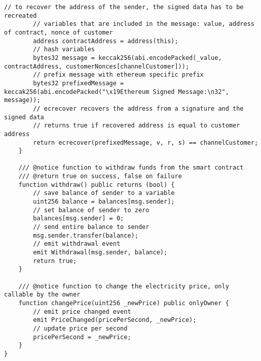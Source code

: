 \begin{lstlisting}[language=Solidity, caption={Payment Channel Smart Contract}, label={lis:pc_sc}]
        // to recover the address of the sender, the signed data has to be recreated
        // variables that are included in the message: value, address of contract, nonce of customer
        address contractAddress = address(this);
        // hash variables
        bytes32 message = keccak256(abi.encodePacked(_value, contractAddress, customerNonces[channelCustomer]));
        // prefix message with ethereum specific prefix
        bytes32 prefixedMessage = keccak256(abi.encodePacked("\x19Ethereum Signed Message:\n32", message));
        // ecrecover recovers the address from a signature and the signed data
        // returns true if recovered address is equal to customer address
        return ecrecover(prefixedMessage, v, r, s) == channelCustomer;
    }

    /// @notice function to withdraw funds from the smart contract
    /// @return true on success, false on failure
    function withdraw() public returns (bool) {
        // save balance of sender to a variable
        uint256 balance = balances[msg.sender];
        // set balance of sender to zero
        balances[msg.sender] = 0;
        // send entire balance to sender
        msg.sender.transfer(balance);
        // emit withdrawal event
        emit Withdrawal(msg.sender, balance);
        return true;
    }

    /// @notice function to change the electricity price, only callable by the owner
    function changePrice(uint256 _newPrice) public onlyOwner {
        // emit price changed event
        emit PriceChanged(pricePerSecond, _newPrice);
        // update price per second
        pricePerSecond = _newPrice;
    }
}
\end{lstlisting}